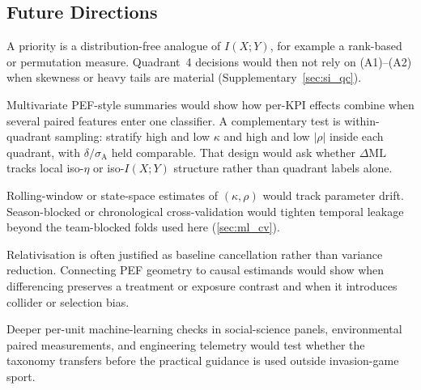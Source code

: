 \subsection{Future Directions}

A priority is a distribution-free analogue of $I(X;Y)$, for example a rank-based or permutation measure. Quadrant~4 decisions would then not rely on (A1)--(A2) when skewness or heavy tails are material (Supplementary~\cref{sec:si_qc}).

Multivariate PEF-style summaries would show how per-KPI effects combine when several paired features enter one classifier. A complementary test is within-quadrant sampling: stratify high and low $\kappa$ and high and low $|\rho|$ inside each quadrant, with $\delta/\sigma_{\mathrm{A}}$ held comparable. That design would ask whether $\Delta\mathrm{ML}$ tracks local iso-$\eta$ or iso-$I(X;Y)$ structure rather than quadrant labels alone.

Rolling-window or state-space estimates of $(\kappa,\rho)$ would track parameter drift. Season-blocked or chronological cross-validation would tighten temporal leakage beyond the team-blocked folds used here (\cref{sec:ml_cv}).

Relativisation is often justified as baseline cancellation rather than variance reduction. Connecting PEF geometry to causal estimands would show when differencing preserves a treatment or exposure contrast and when it introduces collider or selection bias.

Deeper per-unit machine-learning checks in social-science panels, environmental paired measurements, and engineering telemetry would test whether the taxonomy transfers before the practical guidance is used outside invasion-game sport.
